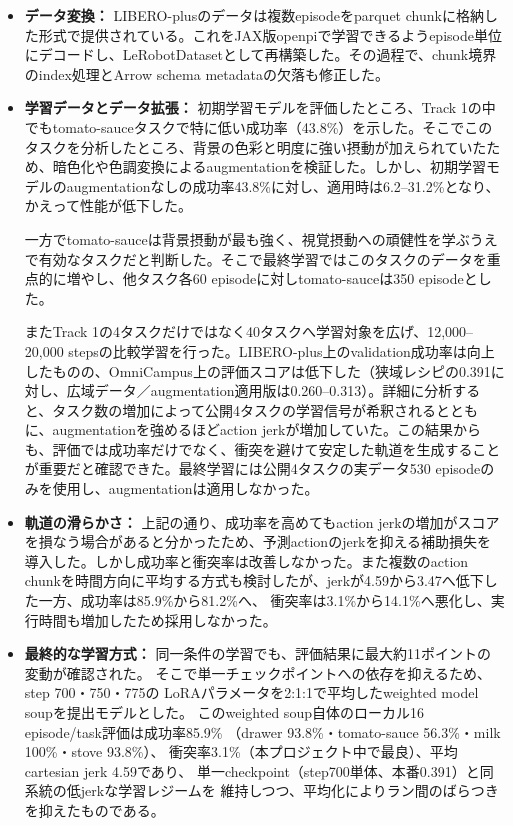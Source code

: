 \documentclass[10pt,a4paper]{article}
\begin{document}
\begin{itemize}
  \item \textbf{データ変換：}
    LIBERO-plusのデータは複数episodeをparquet chunkに格納した形式で提供されている。これをJAX版openpiで学習できるようepisode単位にデコードし、LeRobotDatasetとして再構築した。その過程で、chunk境界のindex処理とArrow schema metadataの欠落も修正した。

  \item \textbf{学習データとデータ拡張：}
    初期学習モデルを評価したところ、Track 1の中でもtomato-sauceタスクで特に低い成功率（43.8\%）を示した。そこでこのタスクを分析したところ、背景の色彩と明度に強い摂動が加えられていたため、暗色化や色調変換によるaugmentationを検証した。しかし、初期学習モデルのaugmentationなしの成功率43.8\%に対し、適用時は6.2--31.2\%となり、かえって性能が低下した。

    一方でtomato-sauceは背景摂動が最も強く、視覚摂動への頑健性を学ぶうえで有効なタスクだと判断した。そこで最終学習ではこのタスクのデータを重点的に増やし、他タスク各60 episodeに対しtomato-sauceは350 episodeとした。

    またTrack 1の4タスクだけではなく40タスクへ学習対象を広げ、12,000--20,000 stepsの比較学習を行った。LIBERO-plus上のvalidation成功率は向上したものの、OmniCampus上の評価スコアは低下した（狭域レシピの0.391に対し、広域データ／augmentation適用版は0.260--0.313）。詳細に分析すると、タスク数の増加によって公開4タスクの学習信号が希釈されるとともに、augmentationを強めるほどaction jerkが増加していた。この結果からも、評価では成功率だけでなく、衝突を避けて安定した軌道を生成することが重要だと確認できた。最終学習には公開4タスクの実データ530 episodeのみを使用し、augmentationは適用しなかった。

  \item \textbf{軌道の滑らかさ：}
    上記の通り、成功率を高めてもaction jerkの増加がスコアを損なう場合があると分かったため、予測actionのjerkを抑える補助損失を導入した。しかし成功率と衝突率は改善しなかった。また複数のaction chunkを時間方向に平均する方式も検討したが、jerkが4.59から3.47へ低下した一方、成功率は85.9\%から81.2\%へ、
    衝突率は3.1\%から14.1\%へ悪化し、実行時間も増加したため採用しなかった。

  \item \textbf{最終的な学習方式：}
    同一条件の学習でも、評価結果に最大約11ポイントの変動が確認された。
    そこで単一チェックポイントへの依存を抑えるため、step 700・750・775の
    LoRAパラメータを2:1:1で平均したweighted model soupを提出モデルとした。
    このweighted soup自体のローカル16 episode/task評価は成功率85.9\%
    （drawer 93.8\%・tomato-sauce 56.3\%・milk 100\%・stove 93.8\%）、
    衝突率3.1\%（本プロジェクト中で最良）、平均cartesian jerk 4.59であり、
    単一checkpoint（step700単体、本番0.391）と同系統の低jerkな学習レジームを
    維持しつつ、平均化によりラン間のばらつきを抑えたものである。
\end{itemize}
\end{document}
